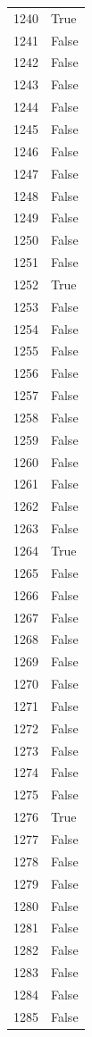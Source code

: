 \documentclass[
  letterpaper,
  DIV=11,
  numbers=noendperiod]{scrreprt}
\begin{document}
\begin{tabular}{ll}
1240 &   True \\
1241 &  False \\
1242 &  False \\
1243 &  False \\
1244 &  False \\
1245 &  False \\
1246 &  False \\
1247 &  False \\
1248 &  False \\
1249 &  False \\
1250 &  False \\
1251 &  False \\
1252 &   True \\
1253 &  False \\
1254 &  False \\
1255 &  False \\
1256 &  False \\
1257 &  False \\
1258 &  False \\
1259 &  False \\
1260 &  False \\
1261 &  False \\
1262 &  False \\
1263 &  False \\
1264 &   True \\
1265 &  False \\
1266 &  False \\
1267 &  False \\
1268 &  False \\
1269 &  False \\
1270 &  False \\
1271 &  False \\
1272 &  False \\
1273 &  False \\
1274 &  False \\
1275 &  False \\
1276 &   True \\
1277 &  False \\
1278 &  False \\
1279 &  False \\
1280 &  False \\
1281 &  False \\
1282 &  False \\
1283 &  False \\
1284 &  False \\
1285 &  False \\

\end{tabular}
\end{document}
